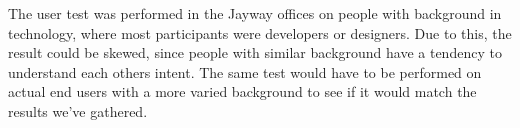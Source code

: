 The user test was performed in the Jayway offices on people with background in 
technology, where most participants were developers or designers. Due to this, the result 
could be skewed, since people with similar background have a tendency to understand 
each others intent. The same test would have to be performed on actual end users with a 
more varied background to see if it would match the results we've gathered.
\newpage